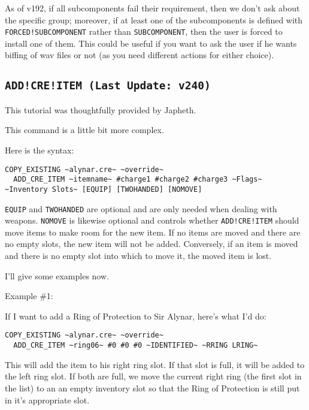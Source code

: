 \documentclass{article}
\def\t#1{{\tt #1}}
\begin{document}
As of v192, if all subcomponents fail their requirement, then we don't ask about
the specific group; moreover, if at least one of the subcomponents is defined with
\t{FORCED!SUBCOMPONENT} rather than \t{SUBCOMPONENT}, then the user is forced to
install one of them. This could be useful if you want to ask the user if he wants
biffing of wav files or not (as you need different actions for either choice).

\label{sec-add-cre-item}\subsection{\tt{ADD!CRE!ITEM} (Last Update: v240)}
This tutorial was thoughtfully provided by Japheth.

This command is a little bit more complex.

Here is the syntax:

\begin{verbatim}
COPY_EXISTING ~alynar.cre~ ~override~
  ADD_CRE_ITEM ~itemname~ #charge1 #charge2 #charge3 ~Flags~ ~Inventory Slots~ [EQUIP] [TWOHANDED] [NOMOVE]
\end{verbatim}

\t{EQUIP} and \t{TWOHANDED} are optional and are only needed when
dealing with weapons. \t{NOMOVE} is likewise optional and controls
whether \t{ADD!CRE!ITEM} should move items to make room for the new
item. If no items are moved and there are no empty slots, the new item
will not be added. Conversely, if an item is moved and there is no
empty slot into which to move it, the moved item is lost.

I'll give some examples now.

Example \#1:

If I want to add a Ring of Protection to Sir Alynar, here's what I'd do:

\begin{verbatim}
COPY_EXISTING ~alynar.cre~ ~override~
  ADD_CRE_ITEM ~ring06~ #0 #0 #0 ~IDENTIFIED~ ~RRING LRING~
\end{verbatim}

This will add the item to his right ring slot. If that slot is full, it
will be added to the left ring slot. If both are full, we move the current
right ring (the first slot in the list) to an an empty inventory slot so
that the Ring of Protection is still put in it's appropriate slot.
\end{document}
